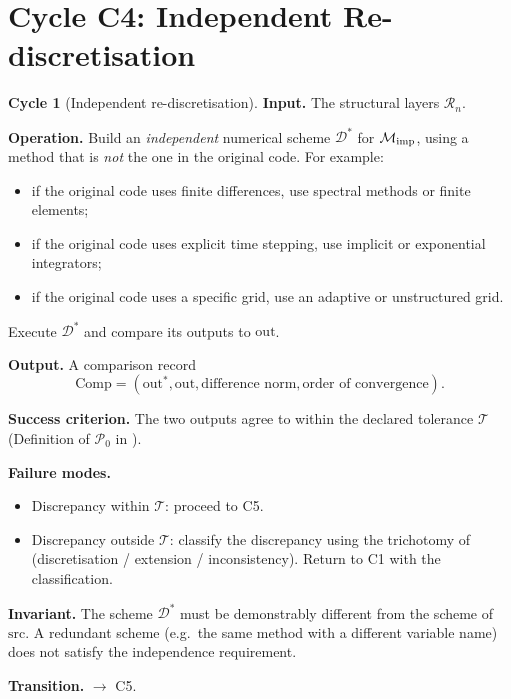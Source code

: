 \documentclass[11pt,a4paper]{article}
\theoremstyle{definition}
\newtheorem{cycle}{Cycle}[section]
\theoremstyle{plain}
\newcommand{\Rcal}{\mathcal{R}}
\newcommand{\Mcal}{\mathcal{M}}
\newcommand{\Pcal}{\mathcal{P}}
\newcommand{\Dcal}{\mathcal{D}}
\begin{document}
\section{Cycle C4: Independent Re-discretisation}
\label{sec:c4}

\begin{cycle}[Independent re-discretisation]\label{cy:c4}
\textbf{Input.} The structural layers $\Rcal_n$.

\medskip
\textbf{Operation.} Build an \emph{independent} numerical scheme
$\Dcal^\ast$ for $\Mcal_{\rm imp}$, using a method that is
\emph{not} the one in the original code. For example:
\begin{itemize}
  \item if the original code uses finite differences, use spectral
        methods or finite elements;
  \item if the original code uses explicit time stepping, use
        implicit or exponential integrators;
  \item if the original code uses a specific grid, use an adaptive
        or unstructured grid.
\end{itemize}
Execute $\Dcal^\ast$ and compare its outputs to $\mathrm{out}$.

\medskip
\textbf{Output.} A comparison record
\[
  \mathrm{Comp} = (\mathrm{out}^\ast, \mathrm{out},
    \text{difference norm}, \text{order of convergence}).
\]

\medskip
\textbf{Success criterion.} The two outputs agree to within the
declared tolerance $\mathcal{T}$ (Definition of $\Pcal_0$ in
\cite[Step P0]{paperI}).

\medskip
\textbf{Failure modes.}
\begin{itemize}
  \item Discrepancy within $\mathcal{T}$: proceed to C5.
  \item Discrepancy outside $\mathcal{T}$: classify the discrepancy
        using the trichotomy of \cite[Theorem 4.3]{paperI}
        (discretisation / extension / inconsistency). Return to C1
        with the classification.
\end{itemize}

\medskip
\textbf{Invariant.} The scheme $\Dcal^\ast$ must be demonstrably
different from the scheme of $\mathrm{src}$. A redundant scheme
(e.g.\ the same method with a different variable name) does not
satisfy the independence requirement.

\medskip
\textbf{Transition.} $\to$ C5.
\end{cycle}
\end{document}
